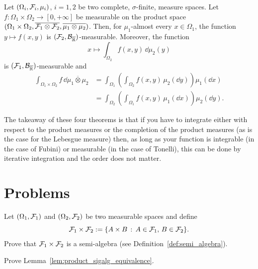 \begin{theorem}
	Let $(\Omega_i, \mathcal F_i, \mu_i)$, $i=1,2$ be two complete, $\sigma$-finite, measure spaces. 
	Let $f : \Omega_1 \times \Omega_2 \to [0,+\infty]$ be measurable on the product space $(\Omega_1 \times \Omega_2, \overline{\mathcal F_1 \otimes \mathcal F_2}, \overline{\mu_1 \otimes \mu_2})$. Then, for $\mu_1$-almost every $x \in \Omega_1$, the function $y \mapsto f(x, y)$ is $(\mathcal F_2,\mathcal B_{\overline{\mathbb R}})$-measurable. Moreover, the function 
	\[
	x \mapsto \int_{\Omega_2} f(x,y)\, \dd \mu_2(y)
	\]
	is $(\mathcal F_1,\mathcal B_{\overline{\mathbb R}})$-measurable and
	\[
	\begin{split}
	\int_{\Omega_1 \times \Omega_2} f \,\dd \overline{\mu_1 \otimes \mu_2} 
	&= \int_{\Omega_1} \left( \int_{\Omega_2 } f(x,  y ) \,\mu_2(\dd y) \right) \mu_1(\dd x)\\
	&= \int_{\Omega_2} \left( \int_{\Omega_1} f(x, y)  \,\mu_1(\dd x) \right) \mu_2(\dd y).
	\end{split}
	\] 	
\end{theorem}

The takeaway of these four theorems is that if you have to integrate either with respect to the product measures or the completion of the product measures (as is the case for the Lebesgue measure) then, as long as your function is integrable (in the case of Fubini) or measurable (in the case of Tonelli), this can be done by iterative integration and the order does not matter.

\section{Problems}

\begin{problem}\label{prb:construction-product-measure}
Let $(\Omega_1, \mathcal F_1)$ and $(\Omega_2, \mathcal F_2)$ be two measurable spaces and define 
\[
	\mathcal F_1 \times \mathcal F_2 := \{A \times B \, : \, A \in \mathcal F_1, \, B \in \mathcal F_2\}.
\]
Prove that $\mathcal F_1 \times \mathcal F_2$ is a semi-algebra (see Definition~\ref{def:semi_algebra}).
\end{problem}

\begin{problem}\label{prb:product_sigalg_equivalence}
Prove Lemma~\ref{lem:product_sigalg_equivalence}.
\end{problem}

